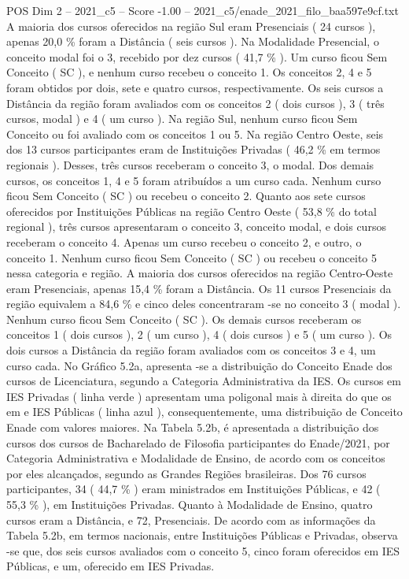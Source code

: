 \begin{textsample}{POS Dim 2 – 2021\_c5 – Score -1.00 – 2021\_c5/enade\_2021\_filo\_baa597e9cf.txt}
A maioria dos cursos oferecidos na região Sul eram Presenciais ( 24 cursos ), apenas 20,0 \% foram a Distância ( seis cursos ).
Na Modalidade Presencial, o conceito modal foi o 3, recebido por dez cursos ( 41,7 \% ).
Um curso ficou Sem Conceito ( SC ), e nenhum curso recebeu o conceito 1.
Os conceitos 2, 4 e 5 foram obtidos por dois, sete e quatro cursos, respectivamente.
Os seis cursos a Distância da região foram avaliados com os conceitos 2 ( dois cursos ), 3 ( três cursos, modal ) e 4 ( um curso ).
Na região Sul, nenhum curso ficou Sem Conceito ou foi avaliado com os conceitos 1 ou 5.
Na região Centro Oeste, seis dos 13 cursos participantes eram de Instituições Privadas ( 46,2 \% em termos regionais ).
Desses, três cursos receberam o conceito 3, o modal.
Dos demais cursos, os conceitos 1, 4 e 5 foram atribuídos a um curso cada.
Nenhum curso ficou Sem Conceito ( SC ) ou recebeu o conceito 2.
Quanto aos sete cursos oferecidos por Instituições Públicas na região Centro Oeste ( 53,8 \% do total regional ), três cursos apresentaram o conceito 3, conceito modal, e dois cursos receberam o conceito 4.
Apenas um curso recebeu o conceito 2, e outro, o conceito 1.
Nenhum curso ficou Sem Conceito ( SC ) ou recebeu o conceito 5 nessa categoria e região.
A maioria dos cursos oferecidos na região Centro-Oeste eram Presenciais, apenas 15,4 \% foram a Distância.
Os 11 cursos Presenciais da região equivalem a 84,6 \% e cinco deles concentraram -se no conceito 3 ( modal ).
Nenhum curso ficou Sem Conceito ( SC ).
Os demais cursos receberam os conceitos 1 ( dois cursos ), 2 ( um curso ), 4 ( dois cursos ) e 5 ( um curso ).
Os dois cursos a Distância da região foram avaliados com os conceitos 3 e 4, um curso cada.
No Gráfico 5.2a, apresenta -se a distribuição do Conceito Enade dos cursos de Licenciatura, segundo a Categoria Administrativa da IES.
Os cursos em IES Privadas ( linha verde ) apresentam uma poligonal mais à direita do que os em e IES Públicas ( linha azul ), consequentemente, uma distribuição de Conceito Enade com valores maiores.
Na Tabela 5.2b, é apresentada a distribuição dos cursos dos cursos de Bacharelado de Filosofia participantes do Enade/2021, por Categoria Administrativa e Modalidade de Ensino, de acordo com os conceitos por eles alcançados, segundo as Grandes Regiões brasileiras.
Dos 76 cursos participantes, 34 ( 44,7 \% ) eram ministrados em Instituições Públicas, e 42 ( 55,3 \% ), em Instituições Privadas.
Quanto à Modalidade de Ensino, quatro cursos eram a Distância, e 72, Presenciais.
De acordo com as informações da Tabela 5.2b, em termos nacionais, entre Instituições Públicas e Privadas, observa -se que, dos seis cursos avaliados com o conceito 5, cinco foram oferecidos em IES Públicas, e um, oferecido em IES Privadas.

\end{textsample}
